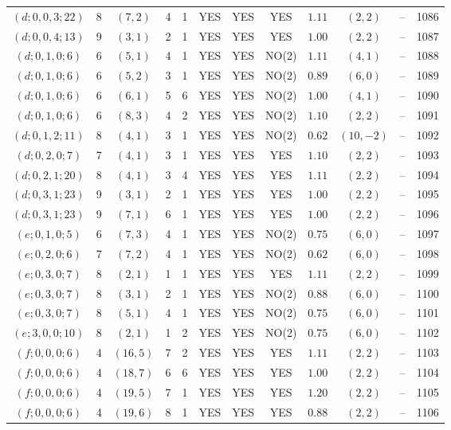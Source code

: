 \begin{longtable}{|c|c|c|c|c|c|c|c|c|c|c|c|}
$(d;0,0,3;22)$ & 8 & $(7,2)$ & 4 & 1 & YES & YES & YES & $1.11$ & $(2,2)$ & -- & 1086\\
$(d;0,0,4;13)$ & 9 & $(3,1)$ & 2 & 1 & YES & YES & YES & $1.00$ & $(2,2)$ & -- & 1087\\
$(d;0,1,0;6)$ & 6 & $(5,1)$ & 4 & 1 & YES & YES & NO(2) & $1.11$ & $(4,1)$ & -- & 1088\\
$(d;0,1,0;6)$ & 6 & $(5,2)$ & 3 & 1 & YES & YES & NO(2) & $0.89$ & $(6,0)$ & -- & 1089\\
$(d;0,1,0;6)$ & 6 & $(6,1)$ & 5 & 6 & YES & YES & NO(2) & $1.00$ & $(4,1)$ & -- & 1090\\
$(d;0,1,0;6)$ & 6 & $(8,3)$ & 4 & 2 & YES & YES & NO(2) & $1.10$ & $(2,2)$ & -- & 1091\\
$(d;0,1,2;11)$ & 8 & $(4,1)$ & 3 & 1 & YES & YES & NO(2) & $0.62$ & $(10,-2)$ & -- & 1092\\
$(d;0,2,0;7)$ & 7 & $(4,1)$ & 3 & 1 & YES & YES & YES & $1.10$ & $(2,2)$ & -- & 1093\\
$(d;0,2,1;20)$ & 8 & $(4,1)$ & 3 & 4 & YES & YES & YES & $1.11$ & $(2,2)$ & -- & 1094\\
$(d;0,3,1;23)$ & 9 & $(3,1)$ & 2 & 1 & YES & YES & YES & $1.00$ & $(2,2)$ & -- & 1095\\
$(d;0,3,1;23)$ & 9 & $(7,1)$ & 6 & 1 & YES & YES & YES & $1.00$ & $(2,2)$ & -- & 1096\\
$(e;0,1,0;5)$ & 6 & $(7,3)$ & 4 & 1 & YES & YES & NO(2) & $0.75$ & $(6,0)$ & -- & 1097\\
$(e;0,2,0;6)$ & 7 & $(7,2)$ & 4 & 1 & YES & YES & NO(2) & $0.62$ & $(6,0)$ & -- & 1098\\
$(e;0,3,0;7)$ & 8 & $(2,1)$ & 1 & 1 & YES & YES & YES & $1.11$ & $(2,2)$ & -- & 1099\\
$(e;0,3,0;7)$ & 8 & $(3,1)$ & 2 & 1 & YES & YES & NO(2) & $0.88$ & $(6,0)$ & -- & 1100\\
$(e;0,3,0;7)$ & 8 & $(5,1)$ & 4 & 1 & YES & YES & NO(2) & $0.75$ & $(6,0)$ & -- & 1101\\
$(e;3,0,0;10)$ & 8 & $(2,1)$ & 1 & 2 & YES & YES & NO(2) & $0.75$ & $(6,0)$ & -- & 1102\\
$(f;0,0,0;6)$ & 4 & $(16,5)$ & 7 & 2 & YES & YES & YES & $1.11$ & $(2,2)$ & -- & 1103\\
$(f;0,0,0;6)$ & 4 & $(18,7)$ & 6 & 6 & YES & YES & YES & $1.00$ & $(2,2)$ & -- & 1104\\
$(f;0,0,0;6)$ & 4 & $(19,5)$ & 7 & 1 & YES & YES & YES & $1.20$ & $(2,2)$ & -- & 1105\\
$(f;0,0,0;6)$ & 4 & $(19,6)$ & 8 & 1 & YES & YES & YES & $0.88$ & $(2,2)$ & -- & 1106\\

\end{longtable}
